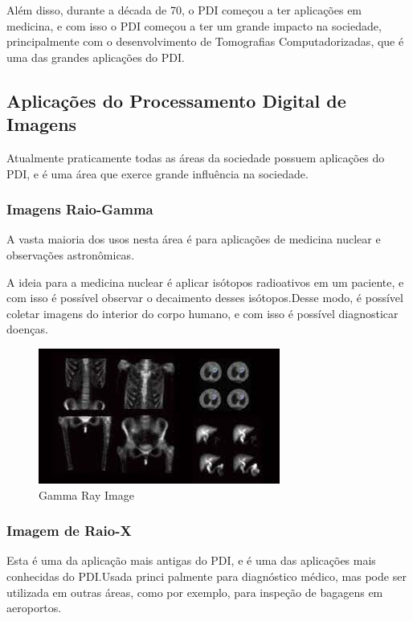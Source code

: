 \documentclass[12pt]{article}
\begin{document}
Além disso, durante a década de 70, o PDI começou a ter aplicações em medicina, e com isso o PDI
começou a ter um grande impacto na sociedade, principalmente com o desenvolvimento de Tomografias
Computadorizadas, que é uma das grandes aplicações do PDI.

\subsection{Aplicações do Processamento Digital de Imagens}

Atualmente praticamente todas as áreas da sociedade possuem aplicações do PDI, e é uma área que
exerce grande influência na sociedade.

\subsubsection{Imagens Raio-Gamma}

A vasta maioria dos usos nesta área é para aplicações de medicina nuclear e observações astronômicas.

A ideia para a medicina nuclear é aplicar isótopos radioativos em um paciente, e com isso é possível
observar o decaimento desses isótopos.Desse modo, é possível coletar imagens do interior do corpo
humano, e com isso é possível diagnosticar doenças.

\begin{figure}[h]
    \centering
    \includegraphics{images/3.jpeg}
    \caption{Gamma Ray Image}
    \label{fig:exemplo}
\end{figure}

\subsubsection{Imagem de Raio-X}

Esta é uma da aplicação mais antigas do PDI, e é uma das aplicações mais conhecidas do PDI.Usada princi
palmente para diagnóstico médico, mas pode ser utilizada em outras áreas, como por exemplo, para
inspeção de bagagens em aeroportos.
\end{document}
